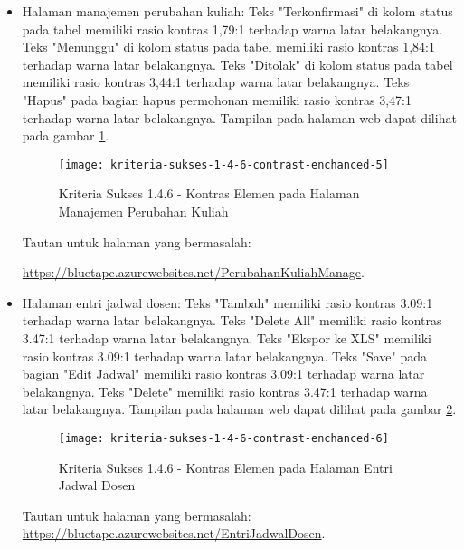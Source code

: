 \begin{itemize}
    \item Halaman manajemen perubahan kuliah: Teks "Terkonfirmasi" di kolom status pada tabel memiliki rasio kontras 1,79:1 terhadap warna latar belakangnya. Teks "Menunggu" di kolom status pada tabel memiliki rasio kontras 1,84:1 terhadap warna latar belakangnya. Teks "Ditolak" di kolom status pada tabel memiliki rasio kontras 3,44:1 terhadap warna latar belakangnya. Teks "Hapus" pada bagian hapus permohonan memiliki rasio kontras 3,47:1 terhadap warna latar belakangnya. Tampilan pada halaman web dapat dilihat pada gambar \ref{fig:1.4.6_contrast_enchanced_5}.
    \begin{figure}[H]
        \centering  
        \texttt{[image: kriteria-sukses-1-4-6-contrast-enchanced-5]}  
        \caption[Kriteria Sukses 1.4.6 - Kontras Elemen pada Halaman Manajemen Perubahan Kuliah]{Kriteria Sukses 1.4.6 - Kontras Elemen pada Halaman Manajemen Perubahan Kuliah}
        \label{fig:1.4.6_contrast_enchanced_5}  
    \end{figure} 
    Tautan untuk halaman yang bermasalah: 
    
    \url{https://bluetape.azurewebsites.net/PerubahanKuliahManage}.

    \item Halaman entri jadwal dosen: Teks "Tambah" memiliki rasio kontras 3.09:1 terhadap warna latar belakangnya. Teks "Delete All" memiliki rasio kontras 3.47:1 terhadap warna latar belakangnya. Teks "Ekspor ke XLS" memiliki rasio kontras 3.09:1 terhadap warna latar belakangnya. Teks "Save" pada bagian "Edit Jadwal" memiliki rasio kontras 3.09:1 terhadap warna latar belakangnya. Teks "Delete" memiliki rasio kontras 3.47:1 terhadap warna latar belakangnya. Tampilan pada halaman web dapat dilihat pada gambar \ref{fig:1.4.6_contrast_enchanced_6}.
    \begin{figure}[H]
        \centering  
        \texttt{[image: kriteria-sukses-1-4-6-contrast-enchanced-6]}  
        \caption[Kriteria Sukses 1.4.6 - Kontras Elemen pada Halaman Entri Jadwal Dosen]{Kriteria Sukses 1.4.6 - Kontras Elemen pada Halaman Entri Jadwal Dosen}
        \label{fig:1.4.6_contrast_enchanced_6}  
    \end{figure} 
    Tautan untuk halaman yang bermasalah: \url{https://bluetape.azurewebsites.net/EntriJadwalDosen}.
    

\end{itemize}
